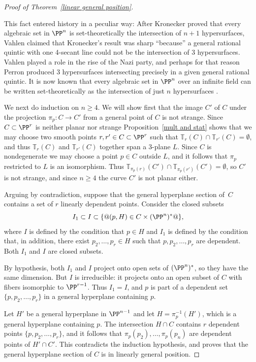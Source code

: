 \begin{proof}[Proof of Theorem~\ref{linear general position}]
\begin{fact}
 This fact entered history in a peculiar way:
 After Kronecker \citeyear{Kronecker} proved that every algebraic set in
  $\PP^{n}$ is set-theoretically the intersection of $n+1$
%
%
%
%
  hypersurfaces, 
Vahlen \citeyear{Vahlen} claimed that Kronecker's result was
  sharp ``because'' a general 
rational quintic
%
with one 4-secant line
  could not be the intersection of 3 hypersurfaces.
  Vahlen played a role in the rise of the Nazi party, and perhaps for
  that reason 
Perron \citeyear{Perron} produced 3 hypersurfaces intersecting
%
  precisely in a given general rational quintic. It is now known that
  every algebraic set in
  $\PP^{n}$ over an infinite field can be written set-theoretically as
  the intersection of just $n$ hypersurfaces \cite{Eisenbud-Evans}.
\end{fact}

We next do induction on $n\geq 4$. We will show first that the image
$C'$ of
$C$ under the projection $\pi_p: C\to C'$ from a general point of $C$
is not strange. Since $C\subset \PP^r$ is neither
planar nor strange
Proposition~\ref{mult and stat} shows that we may choose two smooth points
$r,r'\in C\subset \PP^r$ such that ${\mathbb T}_r(C)\cap {\mathbb T}_{r'}(C) = \emptyset$,
and thus
${\mathbb T}_r(C)$ and ${\mathbb T}_{r'}(C)$ together span a 3-plane $L$. Since $C$ is
nondegenerate we may
choose a point $p\in C$ outside $L$, and it follows that $\pi_p$
restricted to $L$ is an isomorphism.
Thus ${\mathbb T}_{\pi_p(r)}(C') \cap {\mathbb T}_{\pi_p({r'})}(C') = \emptyset$, so $C'$
is not strange,
and since $n\geq 4$ the curve $C'$ is not planar either.

Arguing by contradiction, suppose that the general hyperplane section
of~$C$ contains a set of $r$ linearly dependent points. Consider the
closed subsets
$$
I_1 \subset I \subset \{@(p,H) \in C \times (\PP^n)^*@\}
,
$$
where $I$ is defined by the 
condition
that $p\in H$ and $I_1$ is defined
by the condition that, in addition, there exist $p_2,\dots, p_r\in H$
such that $p, p_2, \dots, p_r$ are dependent. Both $I_1$ and $I$ are
closed subsets.

By hypothesis, both $I_1$ and $I$ project onto open sets of $(\PP^n)^*$,
so they have the same dimension.
But $I$ is irreducible: it projects onto an open subset of $C$ with
fibers isomorphic to $\PP^{r-1}$. Thus $I_1 = I$,
and  $p$ is part of a dependent set
$\{p, p_2,\dots, p_r\}$ in a general hyperplane containing $p$.

Let $H'$ be a general hyperplane in $\PP^{n-1}$
and let $H = \pi_p^{-1}(H')$, which is a general hyperplane containing
$p$. The intersection $H\cap C$
contains $r$ dependent points $\{p, p_2,\dots, p_r\}$, and it follows
that $\pi_p(p_2),\dots,\pi_p(p_n)$
are dependent points of $H'\cap C'$. This contradicts the induction
hypothesis, and proves that
the general hyperplane section of $C$ is in linearly general position.
\end{proof}

